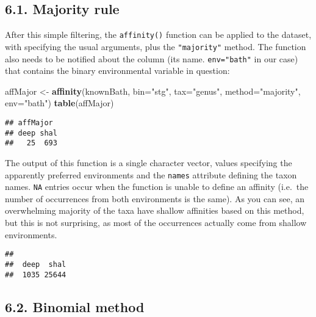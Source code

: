 \documentclass[]{article}
\newenvironment{Shaded}{\begin{snugshade}}{\end{snugshade}}
\newcommand{\KeywordTok}[1]{\textcolor[rgb]{0.13,0.29,0.53}{\textbf{{#1}}}}
\newcommand{\DataTypeTok}[1]{\textcolor[rgb]{0.13,0.29,0.53}{{#1}}}
\newcommand{\StringTok}[1]{\textcolor[rgb]{0.31,0.60,0.02}{{#1}}}
\newcommand{\NormalTok}[1]{{#1}}
\begin{document}
\subsection{6.1. Majority rule}\label{majority-rule}

After this simple filtering, the \texttt{affinity()} function can be
applied to the dataset, with specifying the usual arguments, plus the
\texttt{"majority"} method. The function also needs to be notified about
the column (its name. \texttt{env="bath"} in our case) that contains the
binary environmental variable in question:

\begin{Shaded}
\begin{Highlighting}[]
\NormalTok{affMajor <-}\StringTok{ }\KeywordTok{affinity}\NormalTok{(knownBath, }\DataTypeTok{bin=}\StringTok{"stg"}\NormalTok{, }\DataTypeTok{tax=}\StringTok{"genus"}\NormalTok{, }
  \DataTypeTok{method=}\StringTok{"majority"}\NormalTok{, }\DataTypeTok{env=}\StringTok{"bath"}\NormalTok{)}
\KeywordTok{table}\NormalTok{(affMajor)}
\end{Highlighting}
\end{Shaded}

\begin{verbatim}
## affMajor
## deep shal 
##   25  693
\end{verbatim}

The output of this function is a single character vector, values
specifying the apparently preferred environments and the \texttt{names}
attribute defining the taxon names. \texttt{NA} entries occur when the
function is unable to define an affinity (i.e.~the number of occurrences
from both environments is the same). As you can see, an overwhelming
majority of the taxa have shallow affinities based on this method, but
this is not surprising, as most of the occurrences actually come from
shallow environments.

\begin{Shaded}
\end{Shaded}

\begin{verbatim}
## 
##  deep  shal 
##  1035 25644
\end{verbatim}

\subsection{6.2. Binomial method}\label{binomial-method}
\end{document}
